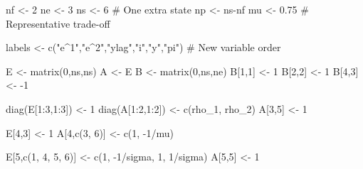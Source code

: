 \documentclass[
  letterpaper,
]{book}
\newenvironment{Shaded}{\begin{snugshade}}{\end{snugshade}}
\newcommand{\CommentTok}[1]{\textcolor[rgb]{0.37,0.37,0.37}{#1}}
\newcommand{\DecValTok}[1]{\textcolor[rgb]{0.68,0.00,0.00}{#1}}
\newcommand{\FloatTok}[1]{\textcolor[rgb]{0.68,0.00,0.00}{#1}}
\newcommand{\FunctionTok}[1]{\textcolor[rgb]{0.28,0.35,0.67}{#1}}
\newcommand{\NormalTok}[1]{\textcolor[rgb]{0.00,0.23,0.31}{#1}}
\newcommand{\OtherTok}[1]{\textcolor[rgb]{0.00,0.23,0.31}{#1}}
\newcommand{\SpecialCharTok}[1]{\textcolor[rgb]{0.37,0.37,0.37}{#1}}
\newcommand{\StringTok}[1]{\textcolor[rgb]{0.13,0.47,0.30}{#1}}
\begin{document}
\begin{Shaded}
\begin{Highlighting}[]
\NormalTok{nf }\OtherTok{\textless{}{-}} \DecValTok{2}
\NormalTok{ne }\OtherTok{\textless{}{-}} \DecValTok{3}
\NormalTok{ns }\OtherTok{\textless{}{-}} \DecValTok{6}      \CommentTok{\# One extra state}
\NormalTok{np }\OtherTok{\textless{}{-}}\NormalTok{ ns}\SpecialCharTok{{-}}\NormalTok{nf}
\NormalTok{mu }\OtherTok{\textless{}{-}} \FloatTok{0.75}   \CommentTok{\# Representative trade{-}off}

\NormalTok{labels }\OtherTok{\textless{}{-}} \FunctionTok{c}\NormalTok{(}\StringTok{"e\^{}1"}\NormalTok{,}\StringTok{"e\^{}2"}\NormalTok{,}\StringTok{"ylag"}\NormalTok{,}\StringTok{"i"}\NormalTok{,}\StringTok{"y"}\NormalTok{,}\StringTok{"pi"}\NormalTok{) }\CommentTok{\# New variable order}

\NormalTok{E }\OtherTok{\textless{}{-}} \FunctionTok{matrix}\NormalTok{(}\DecValTok{0}\NormalTok{,ns,ns)}
\NormalTok{A }\OtherTok{\textless{}{-}}\NormalTok{ E}
\NormalTok{B }\OtherTok{\textless{}{-}} \FunctionTok{matrix}\NormalTok{(}\DecValTok{0}\NormalTok{,ns,ne)}
\NormalTok{B[}\DecValTok{1}\NormalTok{,}\DecValTok{1}\NormalTok{] }\OtherTok{\textless{}{-}} \DecValTok{1}
\NormalTok{B[}\DecValTok{2}\NormalTok{,}\DecValTok{2}\NormalTok{] }\OtherTok{\textless{}{-}} \DecValTok{1}
\NormalTok{B[}\DecValTok{4}\NormalTok{,}\DecValTok{3}\NormalTok{] }\OtherTok{\textless{}{-}} \SpecialCharTok{{-}}\DecValTok{1}

\FunctionTok{diag}\NormalTok{(E[}\DecValTok{1}\SpecialCharTok{:}\DecValTok{3}\NormalTok{,}\DecValTok{1}\SpecialCharTok{:}\DecValTok{3}\NormalTok{]) }\OtherTok{\textless{}{-}} \DecValTok{1}
\FunctionTok{diag}\NormalTok{(A[}\DecValTok{1}\SpecialCharTok{:}\DecValTok{2}\NormalTok{,}\DecValTok{1}\SpecialCharTok{:}\DecValTok{2}\NormalTok{]) }\OtherTok{\textless{}{-}} \FunctionTok{c}\NormalTok{(rho\_1, rho\_2)}
\NormalTok{A[}\DecValTok{3}\NormalTok{,}\DecValTok{5}\NormalTok{]           }\OtherTok{\textless{}{-}} \DecValTok{1}

\NormalTok{E[}\DecValTok{4}\NormalTok{,}\DecValTok{3}\NormalTok{]           }\OtherTok{\textless{}{-}} \DecValTok{1}
\NormalTok{A[}\DecValTok{4}\NormalTok{,}\FunctionTok{c}\NormalTok{(}\DecValTok{3}\NormalTok{, }\DecValTok{6}\NormalTok{)]     }\OtherTok{\textless{}{-}} \FunctionTok{c}\NormalTok{(}\DecValTok{1}\NormalTok{, }\SpecialCharTok{{-}}\DecValTok{1}\SpecialCharTok{/}\NormalTok{mu)}

\NormalTok{E[}\DecValTok{5}\NormalTok{,}\FunctionTok{c}\NormalTok{(}\DecValTok{1}\NormalTok{, }\DecValTok{4}\NormalTok{, }\DecValTok{5}\NormalTok{, }\DecValTok{6}\NormalTok{)] }\OtherTok{\textless{}{-}} \FunctionTok{c}\NormalTok{(}\DecValTok{1}\NormalTok{, }\SpecialCharTok{{-}}\DecValTok{1}\SpecialCharTok{/}\NormalTok{sigma, }\DecValTok{1}\NormalTok{, }\DecValTok{1}\SpecialCharTok{/}\NormalTok{sigma)}
\NormalTok{A[}\DecValTok{5}\NormalTok{,}\DecValTok{5}\NormalTok{]           }\OtherTok{\textless{}{-}} \DecValTok{1}


\end{Highlighting}
\end{Shaded}
\end{document}
